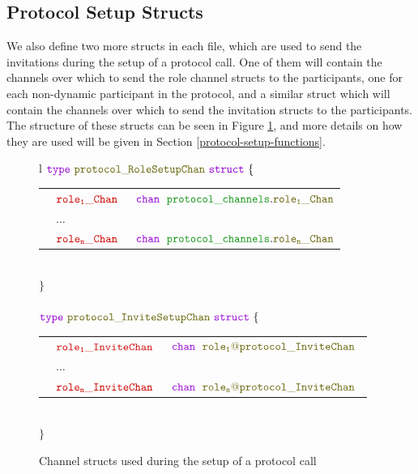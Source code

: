 \documentclass[12pt,twoside]{report}
\begin{document}
\subsection{Protocol Setup Structs}\label{protocol-setup-structs}

We also define two more structs in each file, which are used to send the invitations during the setup of a protocol call. One of them will contain the channels over which to send the role channel structs to the participants, one for each non-dynamic participant in the protocol, and a similar struct which will contain the channels over which to send the invitation structs to the participants. The structure of these structs can be seen in Figure \ref{protocol-setup-structs-gen}, and more details on how they are used will be given in Section \ref{protocol-setup-functions}.

\begin{figure}[!h]
    \begin{center}
        \begin{tabular}{l}
            $\gotype\ \structname{protocol\_\!RoleSetupChan}\ \gostruct\ \{$\\[3pt]
            \begin{tabular}{lll}
                \indent & $\structfield{role_1\_Chan}$\ &$\gochan\ \;\pkgstructaccess{protocol\_channels}{role_1\_Chan}$\\
                \indent & $\dots$ & \\
                \indent & $\structfield{role_n\_Chan}$\ &$\gochan\ \;\pkgstructaccess{protocol\_channels}{role_n\_Chan}$
            \end{tabular}\\
            $\}$\\\\[10pt]
            $\gotype\ \structname{protocol\_\!InviteSetupChan}\ \gostruct\ \{$\\[3pt]
            \begin{tabular}{lll}
                \indent & $\structfield{role_1\_InviteChan}$\ &$\gochan\ \;\structname{role_1@protocol\_InviteChan}$\\
                \indent & $\dots$ & \\
                \indent & $\structfield{role_n\_InviteChan}$\ &$\gochan\ \;\structname{role_n@protocol\_InviteChan}$\
            \end{tabular}\\
            $\}$
        \end{tabular}
    \end{center}
    \caption{Channel structs used during the setup of a protocol call}
    \label{protocol-setup-structs-gen}
\end{figure}
\end{document}
